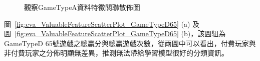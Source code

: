 \begin{figure}[!htb]
    \centering
    \caption[觀察GameTypeA資料特徵關聯散佈圖]{觀察GameTypeA資料特徵關聯散佈圖}
    \label{fig:eva_ValuableFeatureScatterPlot_GameTypeAWithEntered}
\end{figure}
\newpage

圖~\ref{fig:eva_ValuableFeatureScatterPlot_GameTypeD65} (a) 及圖~\ref{fig:eva_ValuableFeatureScatterPlot_GameTypeD65} (b)，該圖組為GameTypeD 65號遊戲之總贏分與總贏遊戲次數，從兩圖中可以看出，付費玩家與非付費玩家之分佈明顯無差異，推測無法帶給學習模型很好的分類資訊。

